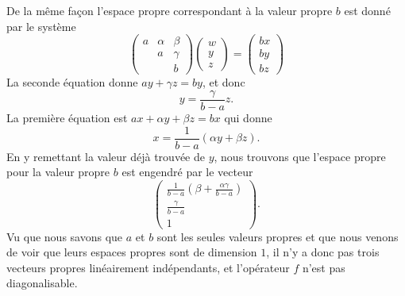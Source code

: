 \begin{remark}
	De la même façon l'espace propre correspondant à la valeur propre \( b\) est donné par le système
	\begin{equation}
		\begin{pmatrix}
			a & \alpha & \beta  \\
			  & a      & \gamma \\
			  &        & b
		\end{pmatrix}\begin{pmatrix}
			w \\
			y \\
			z
		\end{pmatrix}=\begin{pmatrix}
			bx \\
			by \\
			bz
		\end{pmatrix}
	\end{equation}
	La seconde équation donne \( ay+\gamma z=by\), et donc
	\begin{equation}
		y=\frac{ \gamma }{ b-a }z.
	\end{equation}
	La première équation est \( ax+\alpha y+\beta z=bx\) qui donne
	\begin{equation}
		x=\frac{1}{ b-a }(\alpha y+\beta z).
	\end{equation}
	En y remettant la valeur déjà trouvée de \( y\), nous trouvons que l'espace propre pour la valeur propre \( b\) est engendré par le vecteur
	\begin{equation}
		\begin{pmatrix}
			\frac{1}{ b-a }\left( \beta+\frac{ \alpha\gamma }{ b-a } \right) \\
			\frac{ \gamma }{ b-a }                                           \\
			1
		\end{pmatrix}.
	\end{equation}
	Vu que nous savons que \( a\) et \( b\) sont les seules valeurs propres et que nous venons de voir que leurs espaces propres sont de dimension \( 1\), il n'y a donc pas trois vecteurs propres linéairement indépendants, et l'opérateur \( f\) n'est pas diagonalisable.


\end{remark}
